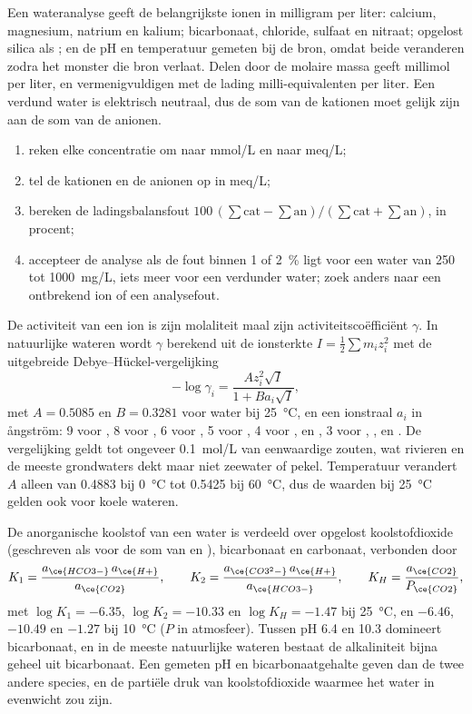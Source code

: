 Een wateranalyse geeft de belangrijkste ionen in milligram per liter: calcium,
magnesium, natrium en kalium; bicarbonaat, chloride, sulfaat en nitraat;
opgelost silica als ; en de pH en temperatuur gemeten bij de bron,
omdat beide veranderen zodra het monster die bron verlaat. Delen door de molaire massa
geeft millimol per liter, en vermenigvuldigen met de lading milli-equivalenten per liter.
Een verdund water is elektrisch neutraal, dus de som van de kationen moet gelijk zijn
aan de som van de anionen.

\begin{method}\label{met:b3:water-rock-interaction:analysis}
\begin{enumerate}
\item reken elke concentratie om naar \unit{mmol/L} en naar \unit{meq/L};
\item tel de kationen en de anionen op in \unit{meq/L};
\item bereken de ladingsbalansfout $100\,(\sum\text{cat} -
  \sum\text{an})/(\sum\text{cat} + \sum\text{an})$, in procent;
\item accepteer de analyse als de fout binnen 1 of \qty{2}{\percent} ligt voor een
  water van 250 tot \qty{1000}{mg/L}, iets meer voor een verdunder water;
  zoek anders naar een ontbrekend ion of een analysefout.
\end{enumerate}
\end{method}

De activiteit van een ion is zijn molaliteit maal zijn activiteitscoëfficiënt
$\gamma$. In natuurlijke wateren wordt $\gamma$ berekend uit de ionsterkte $I =
\tfrac12\sum m_i z_i^2$ met de uitgebreide Debye--Hückel-vergelijking
\[
-\log\gamma_i = \frac{A z_i^2\sqrt I}{1 + B a_i\sqrt I},
\]
met $A = 0.5085$ en $B = 0.3281$ voor water bij \qty{25}{\celsius}, en een
ionstraal $a_i$ in ångström: 9 voor , 8 voor , 6 voor
, 5 voor , 4 voor ,  en ,
3 voor , ,  en . De vergelijking geldt tot ongeveer
\qty{0.1}{mol/L} van eenwaardige zouten, wat rivieren en de meeste grondwaters
dekt maar niet zeewater of pekel. Temperatuur verandert $A$ alleen van
0.4883 bij \qty{0}{\celsius} tot 0.5425 bij \qty{60}{\celsius}, dus de waarden bij
\qty{25}{\celsius} gelden ook voor koele wateren.

De anorganische koolstof van een water is verdeeld over opgelost koolstofdioxide
(geschreven als  voor de som van  en ), bicarbonaat en
carbonaat, verbonden door
\[
K_1 = \frac{a_{\ce{HCO3-}}\,a_{\ce{H+}}}{a_{\ce{CO2}}}, \qquad
K_2 = \frac{a_{\ce{CO3^2-}}\,a_{\ce{H+}}}{a_{\ce{HCO3-}}}, \qquad
K_H = \frac{a_{\ce{CO2}}}{P_{\ce{CO2}}},
\]
met $\log K_1 = -6.35$, $\log K_2 = -10.33$ en $\log K_H = -1.47$ bij
\qty{25}{\celsius}, en $-6.46$, $-10.49$ en $-1.27$ bij \qty{10}{\celsius}
($P$ in atmosfeer). Tussen pH 6.4 en 10.3 domineert bicarbonaat, en in de meeste
natuurlijke wateren bestaat de alkaliniteit bijna geheel uit bicarbonaat. Een
gemeten pH en bicarbonaatgehalte geven dan de twee andere species, en de
partiële druk van koolstofdioxide waarmee het water in evenwicht zou zijn.

